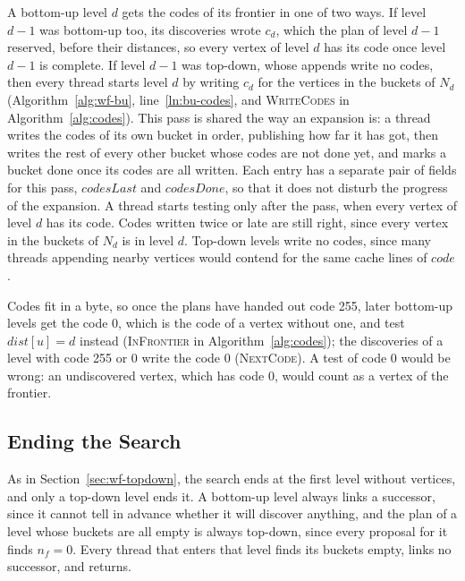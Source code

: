 A bottom-up level $d$ gets the codes of its frontier in one of two ways. If level $d-1$ was bottom-up too, its discoveries wrote $c_d$, which the plan of level $d-1$ reserved, before their distances, so every vertex of level $d$ has its code once level $d-1$ is complete. If level $d-1$ was top-down, whose appends write no codes, then every thread starts level $d$ by writing $c_d$ for the vertices in the buckets of $N_d$ (Algorithm~\ref{alg:wf-bu}, line~\ref{ln:bu-codes}, and \textsc{WriteCodes} in Algorithm~\ref{alg:codes}). This pass is shared the way an expansion is: a thread writes the codes of its own bucket in order, publishing how far it has got, then writes the rest of every other bucket whose codes are not done yet, and marks a bucket done once its codes are all written. Each entry has a separate pair of fields for this pass, $\mathit{codesLast}$ and $\mathit{codesDone}$, so that it does not disturb the progress of the expansion. A thread starts testing only after the pass, when every vertex of level $d$ has its code. Codes written twice or late are still right, since every vertex in the buckets of $N_d$ is in level $d$. Top-down levels write no codes, since many threads appending nearby vertices would contend for the same cache lines of $\mathit{code}$.

Codes fit in a byte, so once the plans have handed out code 255, later bottom-up levels get the code 0, which is the code of a vertex without one, and test $\mathit{dist}[u] = d$ instead (\textsc{InFrontier} in Algorithm~\ref{alg:codes}); the discoveries of a level with code 255 or 0 write the code 0 (\textsc{NextCode}). A test of code 0 would be wrong: an undiscovered vertex, which has code 0, would count as a vertex of the frontier.

\subsection{Ending the Search}
\label{sec:do-end}

As in Section~\ref{sec:wf-topdown}, the search ends at the first level without vertices, and only a top-down level ends it. A bottom-up level always links a successor, since it cannot tell in advance whether it will discover anything, and the plan of a level whose buckets are all empty is always top-down, since every proposal for it finds $n_f = 0$. Every thread that enters that level finds its buckets empty, links no successor, and returns.
